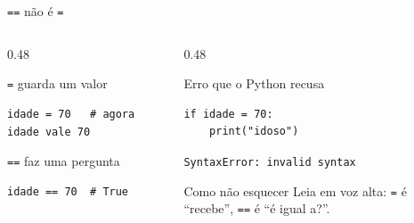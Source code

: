 \documentclass[aspectratio=169]{beamer}
\newcommand{\code}[1]{\texttt{\small #1}}
\begin{document}
\begin{frame}[fragile]{\texttt{==} não é \texttt{=}}
  \begin{columns}[T]
    \begin{column}{0.48\textwidth}
      \begin{block}{\code{=} guarda um valor}
\begin{lstlisting}
idade = 70   # agora idade vale 70
\end{lstlisting}
      \end{block}
      \begin{block}{\code{==} faz uma pergunta}
\begin{lstlisting}
idade == 70  # True
\end{lstlisting}
      \end{block}
    \end{column}
    \begin{column}{0.48\textwidth}
      \begin{alertblock}{Erro que o Python recusa}
\begin{lstlisting}
if idade = 70:
    print("idoso")
\end{lstlisting}
        \code{SyntaxError: invalid syntax}
      \end{alertblock}
      \begin{exampleblock}{Como não esquecer}
        Leia em voz alta: \code{=} é ``recebe'', \code{==} é
        ``é igual a?''.
      \end{exampleblock}
    \end{column}
  \end{columns}
\end{frame}
\end{document}
